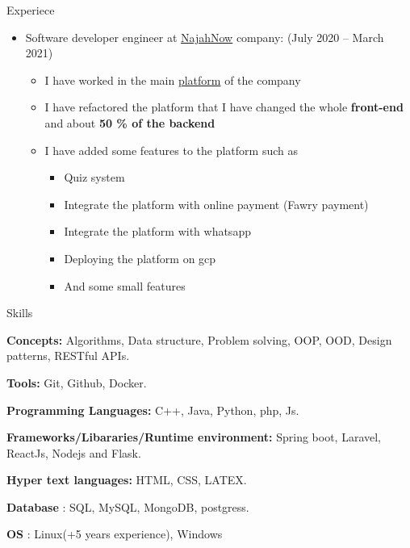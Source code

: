 \documentclass{resume}
\begin{document}
\begin{rSection}{Experiece}
\begin{itemize}
    \item Software developer engineer at \href{https://najahnow.net}{NajahNow} company: \hfill{(July 2020 – March 2021)}
          \begin{itemize}
              \item I have worked in the main \href{https://najahnow.net}{platform} of the company
              \item I have refactored the platform that I have changed the whole \textbf{front-end} and about \textbf{50 \% of the backend}
              \item I have added some features to the platform such as 
              \begin{itemize}
                  \item Quiz system 
                  \item Integrate the platform with online payment (Fawry payment)
                  \item Integrate the platform with whatsapp 
                  \item Deploying the platform on gcp
                  \item And some small features
              \end{itemize}
          \end{itemize}
  \end{itemize}
\end{rSection}


\newpage

\begin{rSection}{Skills}
  \item \textbf{Concepts:} Algorithms, Data structure, Problem solving, OOP, OOD, Design patterns, RESTful APIs.
  \item \textbf{Tools:} Git, Github, Docker.
  \item \textbf{Programming Languages:} C++, Java, Python, php, Js.
  \item \textbf{Frameworks/Libararies/Runtime environment:} Spring boot, Laravel, ReactJs, Nodejs and Flask.
  \item \textbf{Hyper text languages:} HTML, CSS, LATEX.
  \item \textbf{Database}  : SQL, MySQL, MongoDB, postgress.
  \item \textbf{OS} : Linux(+5 years experience), Windows
\end{rSection}
\end{document}
